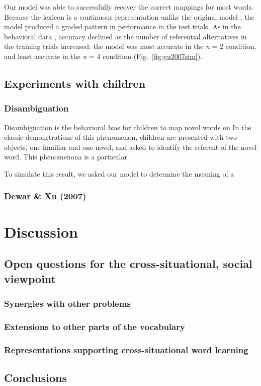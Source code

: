 \documentclass[man,noapacite,12pt]{apa2}
\begin{document}
Our model was able to successfully recover the correct mappings for most words. Because the lexicon is a continuous representation unlike the original model \cite{frank2009}, the model produced a graded pattern in performance in the test trials. As in the behavioral data \cite{yu2007b}, accuracy declined as the number of referential alternatives in the training trials increased: the model was most accurate in the {\it n} = 2 condition, and least accurate in the  {\it n}  = 4 condition (Fig.~\ref{fig:yu2007sim}).

\subsection{Experiments with children}

\subsubsection{Disambiguation}
Disambiguation is the behavioral bias for children to map novel words on  In the classic demonstrations of this phenomenon, children are presented with two objects, one familiar and one novel, and asked to identify the referent of the novel word. This phenomenona is a particular

To simulate this result, we asked our model to determine the meaning of a 

\subsubsection{Dewar \& Xu (2007)}



\section{Discussion}



\subsection{Open questions for the cross-situational, social viewpoint}

\subsubsection{Synergies with other problems}

\subsubsection{Extensions to other parts of the vocabulary}

\subsubsection{Representations supporting cross-situational word learning}

\cite{yurovskyunderreview}

\subsection{Conclusions}

\newpage



\end{document}
